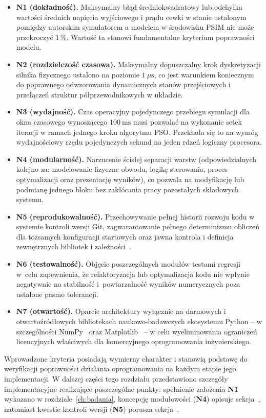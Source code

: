 \begin{itemize}
    \item \textbf{N1 (dokładność).} Maksymalny błąd średniokwadratowy lub odchyłka wartości średnich napięcia wyjściowego i prądu cewki w stanie ustalonym pomiędzy autorskim symulatorem a modelem w środowisku PSIM nie może przekroczyć $1\,\%$. Wartość ta stanowi fundamentalne kryterium poprawności modelu.
    \item \textbf{N2 (rozdzielczość czasowa).} Maksymalny dopuszczalny krok dyskretyzacji silnika fizycznego ustalono na poziomie $1~\mu\mathrm{s}$, co jest warunkiem koniecznym do poprawnego odwzorowania dynamicznych stanów przejściowych i przełączeń struktur półprzewodnikowych w układzie.
    \item \textbf{N3 (wydajność).} Czas operacyjny pojedynczego przebiegu symulacji dla okna czasowego wynoszącego $100~\mathrm{ms}$ musi pozwalać na wykonanie setek iteracji w ramach jednego kroku algorytmu PSO. Przekłada się to na wymóg wydajnościowy rzędu pojedynczych sekund na jeden rdzeń logiczny procesora.
    \item \textbf{N4 (modularność).} Narzucenie ścisłej separacji warstw (odpowiedzialnych kolejno za: modelowanie fizyczne obwodu, logikę sterowania, proces optymalizacji oraz prezentację wyników), co pozwala na modyfikację lub podmianę jednego bloku bez zakłócania pracy pozostałych składowych systemu.
    \item \textbf{N5 (reprodukowalność).} Przechowywanie pełnej historii rozwoju kodu w systemie kontroli wersji Git, zagwarantowanie pełnego determinizmu obliczeń dla tożsamych konfiguracji startowych oraz jawna kontrola i definicja zewnętrznych bibliotek i zależności~\cite{chacon2014progit}.
    \item \textbf{N6 (testowalność).} Objęcie poszczególnych modułów testami regresji w~celu zapewnienia, że refaktoryzacja lub optymalizacja kodu nie wpłynie negatywnie na stabilność i~powtarzalność wyników numerycznych poza ustalone pasmo tolerancji.
    \item \textbf{N7 (otwartość).} Oparcie architektury wyłącznie na darmowych i otwartoźródłowych bibliotekach naukowo-badawczych ekosystemu Python -- w szczególności NumPy~\cite{harris2020numpy} oraz Matplotlib~\cite{hunter2007matplotlib} -- w celu wyeliminowania ograniczeń licencyjnych właściwych dla komercyjnego oprogramowania inżynierskiego.
\end{itemize}

Wprowadzone kryteria posiadają wymierny charakter i stanowią podstawę do weryfikacji poprawności działania oprogramowania na każdym etapie jego implementacji. W dalszej części tego rozdziału przedstawiono szczegóły implementacyjne realizujące poszczególne punkty: spełnienie założenia \textbf{N1} wykazano w rozdziale~\ref{ch:badania}, koncepcję modułowości (\textbf{N4}) opisuje sekcja~, natomiast kwestie kontroli wersji (\textbf{N5}) porusza sekcja~.


